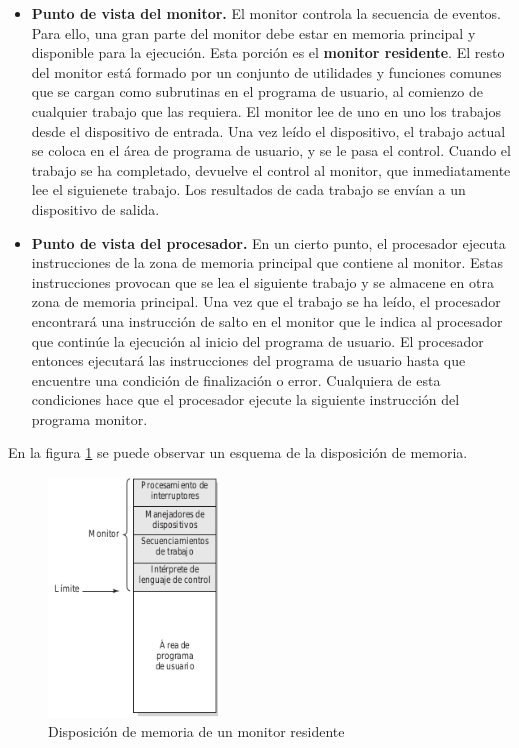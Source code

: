 \documentclass{article}
\begin{document}
					\begin{itemize}
					\item \textbf{Punto de vista del monitor.} El monitor controla la secuencia de eventos. Para ello, una gran parte del monitor debe estar en memoria principal y disponible para la ejecución. Esta porción es el \textbf{monitor residente}. El resto del monitor está formado por un conjunto de utilidades y funciones comunes que se cargan como subrutinas en el programa de usuario, al comienzo de cualquier trabajo que las requiera. El monitor lee de uno en uno los trabajos desde el dispositivo de entrada. Una vez leído el dispositivo, el trabajo actual se coloca en el área de programa de usuario, y se le pasa el control. Cuando el trabajo se ha completado, devuelve el control al monitor, que inmediatamente lee el siguienete trabajo. Los resultados de cada trabajo se envían a un dispositivo de salida.
					
					\item \textbf{Punto de vista del procesador.} En un cierto punto, el procesador ejecuta instrucciones de la zona de memoria principal que contiene al monitor. Estas instrucciones provocan que se lea el siguiente trabajo y se almacene en otra zona de memoria principal. Una vez que el trabajo se ha leído, el procesador encontrará una instrucción de salto en el monitor que le indica al procesador que continúe la ejecución al inicio del programa de usuario. El procesador entonces ejecutará las instrucciones del programa de usuario hasta que encuentre una condición de finalización o error. Cualquiera de esta condiciones hace que el procesador ejecute la siguiente instrucción del programa monitor. 
					\end{itemize}
					
					En la figura \ref{figura16:sistemaenlotes} se puede observar un esquema de la disposición de memoria.
										
					\begin{figure}
					\caption{Disposición de memoria de un monitor residente}
					\label{figura16:sistemaenlotes}
					\centering
					\includegraphics[width=0.4\textwidth, scale=0.5]{figura16.png}
					\end{figure}
					
\end{document}
